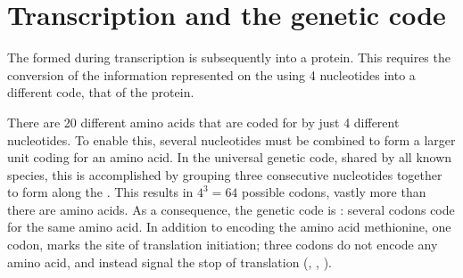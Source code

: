 

\section{Transcription and the genetic code}

The \mrna formed during transcription is subsequently  into a
protein. This requires the conversion of the information represented on the
\mrna using \num{4} nucleotides  into a different code, that of the protein.

There are \num{20} different amino acids that are coded for by just \num{4}
different nucleotides. To enable this, several nucleotides must be combined to
form a larger unit coding for an amino acid. In the universal genetic code,
shared by all known species, this is accomplished by grouping three consecutive
nucleotides together to form  along the \mrna. This results in
\(4^3 = 64\) possible codons, vastly more than there are amino acids. As a
consequence, the genetic code is : several codons code for
the same amino acid. In addition to encoding the amino acid methionine, one
codon,  marks the site of translation initiation; three codons do not
encode any amino acid, and instead signal the stop of translation (,
, ).


